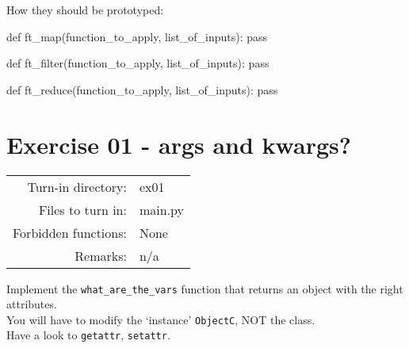 \documentclass[]{article}
\newenvironment{Shaded}{\begin{snugshade}}{\end{snugshade}}
\newcommand{\ControlFlowTok}[1]{\textcolor[rgb]{0.99,0.74,0.29}{#1}}
\newcommand{\KeywordTok}[1]{\textcolor[rgb]{0.81,0.81,0.76}{#1}}
\newcommand{\NormalTok}[1]{\textcolor[rgb]{0.81,0.81,0.76}{#1}}
\begin{document}
How they should be prototyped:

\begin{Shaded}
\begin{Highlighting}[]
\KeywordTok{def}\NormalTok{ ft_map(function_to_apply, list_of_inputs):}
    \ControlFlowTok{pass}

\KeywordTok{def}\NormalTok{ ft_filter(function_to_apply, list_of_inputs):}
    \ControlFlowTok{pass}

\KeywordTok{def}\NormalTok{ ft_reduce(function_to_apply, list_of_inputs):}
    \ControlFlowTok{pass}
\end{Highlighting}
\end{Shaded}

\clearpage

\hypertarget{exercise-01---args-and-kwargs-1}{%
\section{Exercise 01 - args and
kwargs?}\label{exercise-01---args-and-kwargs-1}}

\begin{longtable}[]{@{}rl@{}}
\toprule
\endhead
Turn-in directory: & ex01\tabularnewline
Files to turn in: & main.py\tabularnewline
Forbidden functions: & None\tabularnewline
Remarks: & n/a\tabularnewline
\bottomrule
\end{longtable}

Implement the \texttt{what\_are\_the\_vars} function that returns an
object with the right attributes.\\
You will have to modify the `instance' \texttt{ObjectC}, NOT the
class.\\
Have a look to \texttt{getattr}, \texttt{setattr}.
\end{document}
